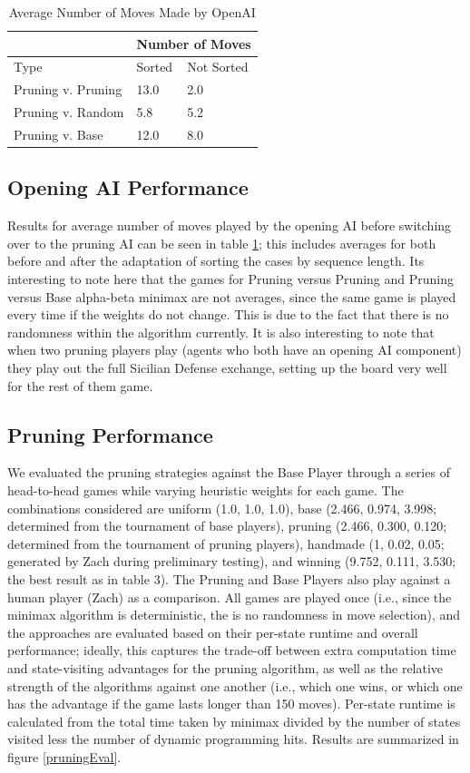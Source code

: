 \documentclass[letterpaper]{article}
\begin{document}
\begin{table}[]
\centering
\begin{tabular}{|l|l|l|}
\hline
 & \multicolumn{2}{l|}{Number of Moves} \\ \hline
Type & Sorted & Not Sorted \\ \hline
Pruning v. Pruning & 13.0 & 2.0 \\ \hline
Pruning v. Random & 5.8 & 5.2 \\ \hline
Pruning v. Base & 12.0 & 8.0 \\ \hline
\end{tabular}
\caption{Average Number of Moves Made by OpenAI}
\label{openings}
\end{table}

\subsection{Opening AI Performance}
Results for average number of moves played by the opening AI before switching over to the pruning AI can be seen in table \ref{openings}; this includes averages for both before and after the adaptation of sorting the cases by sequence length. Its interesting to note here that the games for Pruning versus Pruning and Pruning versus Base alpha-beta minimax are not averages, since the same game is played every time if the weights do not change.  This is due to the fact that there is no randomness within the algorithm currently. It is also interesting to note that when two pruning players play (agents who both have an opening AI component) they play out the full Sicilian Defense exchange, setting up the board very well for the rest of them game. 


\subsection{Pruning Performance}
We evaluated the pruning strategies against the Base Player through a series of head-to-head games while varying heuristic weights for each game.  The combinations considered are uniform (1.0, 1.0, 1.0), base (2.466, 0.974, 3.998; determined from the tournament of base players), pruning (2.466, 0.300, 0.120; determined from the tournament of pruning players), handmade (1, 0.02, 0.05; generated by Zach during preliminary testing), and winning (9.752, 0.111, 3.530; the best result as in table 3).  The Pruning and Base Players also play against a human player (Zach) as a comparison.  All games are played once (i.e., since the minimax algorithm is deterministic, the is no randomness in move selection), and the approaches are evaluated based on their per-state runtime and overall performance; ideally, this captures the trade-off between extra computation time and state-visiting advantages for the pruning algorithm, as well as the relative strength of the algorithms against one another (i.e., which one wins, or which one has the advantage if the game lasts longer than 150 moves).  Per-state runtime is calculated from the total time taken by minimax divided by the number of states visited less the number of dynamic programming hits.  Results are summarized in figure \ref{pruningEval}.
\end{document}

